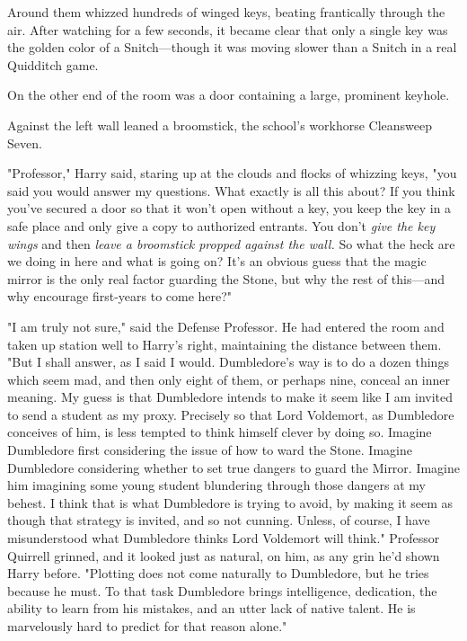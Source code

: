 Around them whizzed hundreds of winged keys, beating frantically through the
air. After watching for a few seconds, it became clear that only a single key
was the golden color of a Snitch---though it was moving slower than a Snitch in
a real Quidditch game.

On the other end of the room was a door containing a large, prominent keyhole.

Against the left wall leaned a broomstick, the school's workhorse Cleansweep
Seven.

"Professor," Harry said, staring up at the clouds and flocks of whizzing keys,
"you said you would answer my questions. What exactly is all this about? If you
think you've secured a door so that it won't open without a key, you keep the
key in a safe place and only give a copy to authorized entrants. You don't
\emph{give the key wings} and then \emph{leave a broomstick propped against the
wall.} So what the heck are we doing in here and what is going on? It's an
obvious guess that the magic mirror is the only real factor guarding the Stone,
but why the rest of this---and why encourage first-years to come here?"

"I am truly not sure," said the Defense Professor. He had entered the room and
taken up station well to Harry's right, maintaining the distance between them.
"But I shall answer, as I said I would. Dumbledore's way is to do a dozen
things which seem mad, and then only eight of them, or perhaps nine, conceal an
inner meaning. My guess is that Dumbledore intends to make it seem like I am
invited to send a student as my proxy. Precisely so that Lord Voldemort, as
Dumbledore conceives of him, is less tempted to think himself clever by doing
so. Imagine Dumbledore first considering the issue of how to ward the Stone.
Imagine Dumbledore considering whether to set true dangers to guard the Mirror.
Imagine him imagining some young student blundering through those dangers at my
behest. I think that is what Dumbledore is trying to avoid, by making it seem
as though that strategy is invited, and so not cunning. Unless, of course, I
have misunderstood what Dumbledore thinks Lord Voldemort will think." Professor
Quirrell grinned, and it looked just as natural, on him, as any grin he'd shown
Harry before. "Plotting does not come naturally to Dumbledore, but he tries
because he must. To that task Dumbledore brings intelligence, dedication, the
ability to learn from his mistakes, and an utter lack of native talent. He is
marvelously hard to predict for that reason alone."

